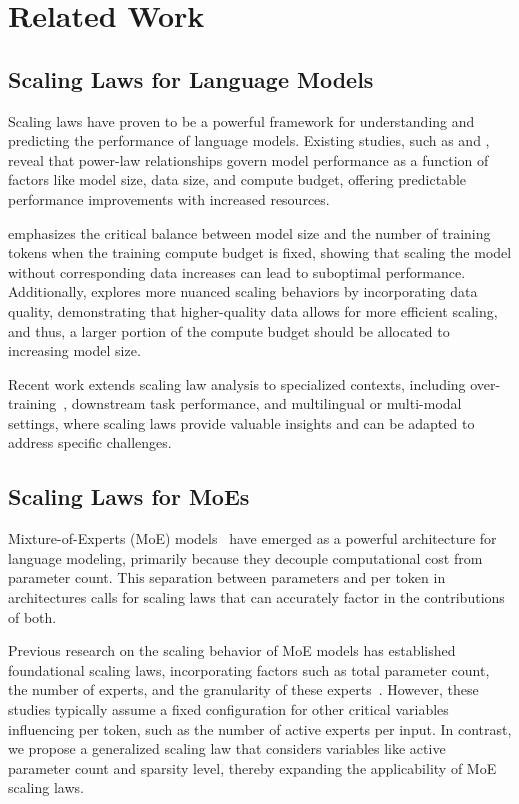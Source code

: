 \section{Related Work}

\subsection{Scaling Laws for Language Models} Scaling laws have proven to be a powerful framework for understanding and predicting the performance of language models. Existing studies, such as \citet{kaplan_scale} and \citet{hoffmann2022training}, reveal that power-law relationships govern model performance as a function of factors like model size, data size, and compute budget, offering predictable performance improvements with increased resources.

\citet{hoffmann2022training} emphasizes the critical balance between model size and the number of training tokens when the training compute budget is fixed, showing that scaling the model without corresponding data increases can lead to suboptimal performance. Additionally, \citet{Bi2024DeepSeekLS} explores more nuanced scaling behaviors by incorporating data quality, demonstrating that higher-quality data allows for more efficient scaling, and thus, a larger portion of the compute budget should be allocated to increasing model size.

Recent work extends scaling law analysis to specialized contexts, including over-training~\citep{Gadre2024overtrain}, downstream task performance, and multilingual or multi-modal settings, where scaling laws provide valuable insights and can be adapted to address specific challenges.

\subsection{Scaling Laws for MoEs} 
Mixture-of-Experts (MoE) models~\citep{shazeer2017,lepikhin2021gshard,fedus_switch,deepseekr1} have emerged as a powerful architecture for language modeling, primarily because they decouple computational cost from parameter count. This separation between parameters and \flops per token in \moe architectures calls for scaling laws that can accurately factor in the contributions of both.

Previous research on the scaling behavior of MoE models has established foundational scaling laws, incorporating factors such as total parameter count, the number of experts, and the granularity of these experts~\citep{clark2022unified, ludziejewski2024scaling, wang-etal-2024-scaling}. However, these studies typically assume a fixed configuration for other critical variables influencing \flops per token, such as the number of active experts per input. In contrast, we propose a generalized scaling law that considers variables like active parameter count and sparsity level, thereby expanding the applicability of MoE scaling laws.

